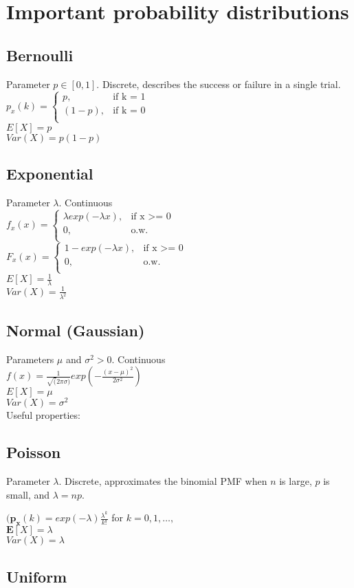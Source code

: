 \section{Important probability distributions}
\subsection*{Bernoulli}
Parameter $p \in[0,1]$. Discrete, describes the success or failure in a single trial.\\
$ p_x(k)=
	\begin{cases}
		 p,&\text{if k = 1}\\
		(1-p),&\text{if k = 0}\\
	\end{cases}
$\\
$E[X]=p$\\
$Var(X)=p(1-p)$
\subsection*{Exponential}
Parameter $\lambda$. Continuous\\
$ f_x(x)=
	\begin{cases}
		 \lambda exp(-\lambda x),&\text{if x >= 0}\\
		0,&\text{o.w.}\\
	\end{cases}
$\\
$ F_x(x)=
	\begin{cases}
		 1-exp(-\lambda x),&\text{if x >= 0}\\
		0,&\text{o.w.}\\
	\end{cases}
$\\
$E[X]=\frac{1}{\lambda}$\\
$Var(X)=\frac{1}{\lambda^2}$

\subsection*{Normal (Gaussian)}
Parameters $\mu$ and $\sigma^2 >0$. Continuous\\
$f(x)= \frac{1}{\sqrt(2 \pi \sigma)} exp(-\frac{(x-\mu)^2}{2\sigma^2})$ \\
$E[X]=\mu$ \\
$Var(X)=\sigma^2$\\
Useful properties:\\


\subsection*{Poisson}
Parameter $\lambda$. Discrete, approximates the binomial PMF when $n$ is large, $p$ is small, and $\lambda = np$.

$(\mathbf{p_x}(k)=exp(-\lambda)\frac{\lambda^k}{k!}$ for $k=0,1, \ldots,$\\

$\mathbf{E}[X]=\lambda$\\
$Var(X)=\lambda$\\

\subsection*{Uniform}

